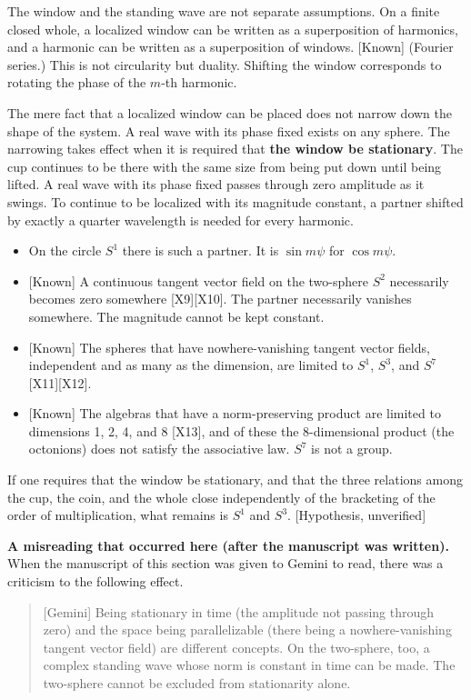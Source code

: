 \documentclass[
  a4paper,
]{article}
\providecommand{\tightlist}{%
  \setlength{\itemsep}{0pt}\setlength{\parskip}{0pt}}
\begin{document}
The window and the standing wave are not separate assumptions. On a
finite closed whole, a localized window can be written as a
superposition of harmonics, and a harmonic can be written as a
superposition of windows. {[}Known{]} (Fourier series.) This is not
circularity but duality. Shifting the window corresponds to rotating the
phase of the \(m\)-th harmonic.

The mere fact that a localized window can be placed does not narrow down
the shape of the system. A real wave with its phase fixed exists on any
sphere. The narrowing takes effect when it is required that \textbf{the
window be stationary}. The cup continues to be there with the same size
from being put down until being lifted. A real wave with its phase fixed
passes through zero amplitude as it swings. To continue to be localized
with its magnitude constant, a partner shifted by exactly a quarter
wavelength is needed for every harmonic.

\begin{itemize}
\tightlist
\item
  On the circle \(S^1\) there is such a partner. It is \(\sin m\psi\)
  for \(\cos m\psi\).
\item
  {[}Known{]} A continuous tangent vector field on the two-sphere
  \(S^2\) necessarily becomes zero somewhere {[}X9{]}{[}X10{]}. The
  partner necessarily vanishes somewhere. The magnitude cannot be kept
  constant.
\item
  {[}Known{]} The spheres that have nowhere-vanishing tangent vector
  fields, independent and as many as the dimension, are limited to
  \(S^1\), \(S^3\), and \(S^7\) {[}X11{]}{[}X12{]}.
\item
  {[}Known{]} The algebras that have a norm-preserving product are
  limited to dimensions 1, 2, 4, and 8 {[}X13{]}, and of these the
  8-dimensional product (the octonions) does not satisfy the associative
  law. \(S^7\) is not a group.
\end{itemize}

If one requires that the window be stationary, and that the three
relations among the cup, the coin, and the whole close independently of
the bracketing of the order of multiplication, what remains is \(S^1\)
and \(S^3\). {[}Hypothesis, unverified{]}

\textbf{A misreading that occurred here (after the manuscript was
written).} When the manuscript of this section was given to Gemini to
read, there was a criticism to the following effect.

\begin{quote}
{[}Gemini{]} Being stationary in time (the amplitude not passing through
zero) and the space being parallelizable (there being a
nowhere-vanishing tangent vector field) are different concepts. On the
two-sphere, too, a complex standing wave whose norm is constant in time
can be made. The two-sphere cannot be excluded from stationarity alone.
\end{quote}
\end{document}
